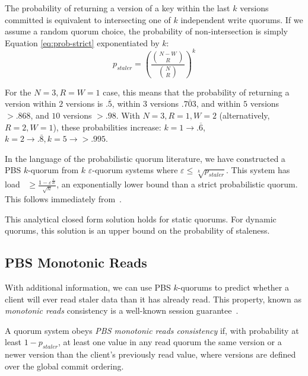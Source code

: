 \documentclass{vldb}
\begin{document}
The probability of returning a version of a key within the last $k$
versions committed is equivalent to intersecting one of $k$
independent write quorums.  If we assume a random quorum choice, the
probability of non-intersection is simply Equation
\ref{eq:prob-strict} exponentiated by $k$:
\begin{equation}
\label{eq:k-consistency}
p_{staler} = \left(\frac{{N-W \choose R}}{{N \choose R}}\right)^k
\end{equation}

For the $N=3, R=W=1$ case, this means that the probability of
returning a version within $2$ versions is $.\overline{5}$, within $3$
versions $.\overline{703}$, and within $5$ versions $> .868$, and $10$
versions $>.98$.  With $N=3, R=1, W=2$ (alternatively, $R=2, W=1$),
these probabilities increase: $k=1 \rightarrow
.\overline{6}$, $k=2 \rightarrow .\overline{8}, k=5 \rightarrow >
.995$.

In the language of the probabilistic quorum literature, we have
constructed a PBS $k$-quorum from $k$ $\varepsilon$-quorum systems
where $\varepsilon \leq \sqrt[k]{p_{staler}}$. This system has load~\cite[Definition 3.2]{quorumsystems}
$\geq \frac{1-\varepsilon^{\frac{1}{2k}}}{\sqrt{n}}$, an exponentially
lower bound than a strict probabilistic quorum.  This follows
immediately from~\cite[Corollary 3.12]{prob-quorum}.

This analytical closed form solution holds for static quorums.  For
dynamic quorums, this solution is an upper bound on the probability of
staleness.

\subsection{PBS Monotonic Reads}

With additional information, we can use PBS $k$-quorums to predict
whether a client will ever read staler data than it has already read.
This property, known as \textit{monotonic reads} consistency is a
well-known session guarantee~\cite{sessionguarantees}.

\begin{definition}
\label{def:prob-mr}
A quorum system obeys \textit{PBS monotonic reads consistency} if,
with probability at least $1-p_{staler}$, at least one value in any
read quorum the same version or a newer version than the client's
previously read value, where versions are defined over the global
commit ordering.
\end{definition}
\end{document}
